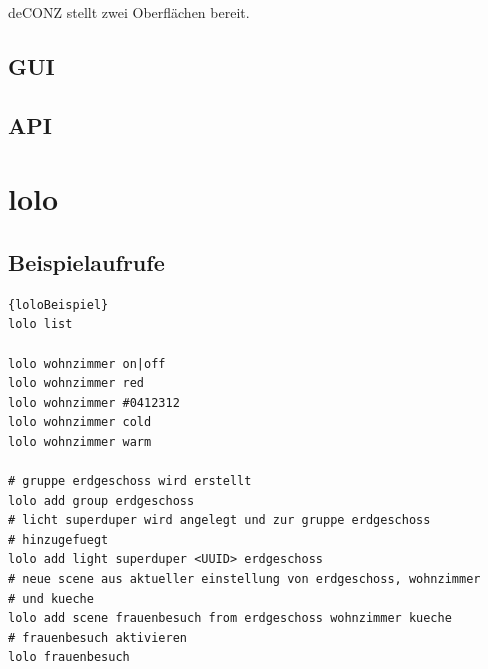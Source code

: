 \documentclass[a4paper,12pt]{article}
\begin{document}
deCONZ stellt zwei Oberflächen bereit.

\subsection{GUI}
\subsection{API}

\section{lolo}

\subsection{Beispielaufrufe}

\begin{lstlisting}[caption=lolo Beispielaufrufe]{loloBeispiel}
lolo list

lolo wohnzimmer on|off
lolo wohnzimmer red
lolo wohnzimmer #0412312
lolo wohnzimmer cold
lolo wohnzimmer warm

# gruppe erdgeschoss wird erstellt
lolo add group erdgeschoss
# licht superduper wird angelegt und zur gruppe erdgeschoss
# hinzugefuegt
lolo add light superduper <UUID> erdgeschoss
# neue scene aus aktueller einstellung von erdgeschoss, wohnzimmer
# und kueche
lolo add scene frauenbesuch from erdgeschoss wohnzimmer kueche
# frauenbesuch aktivieren
lolo frauenbesuch
\end{lstlisting}
\end{document}
